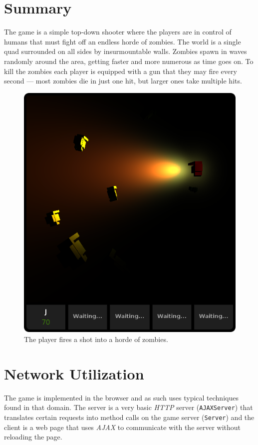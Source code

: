 \documentclass{article}
\begin{document}
\section{Summary}
The game is a simple top-down shooter where the players are in control of humans
that must fight off an endless horde of zombies.  The world is a single quad
surrounded on all sides by insurmountable walls.  Zombies spawn in waves
randomly around the area, getting faster and more numerous as time goes on.  To
kill the zombies each player is equipped with a gun that they may fire every
second --- most zombies die in just one hit, but larger ones take multiple hits.

\begin{figure}[h!]
\centering
\includegraphics[width=0.75\linewidth]{zombies.png}
\caption{The player fires a shot into a horde of zombies.}
\end{figure}

\section{Network Utilization}
The game is implemented in the browser and as such uses typical techniques found
in that domain.  The server is a very basic \textit{HTTP} server (\texttt{AJAXServer})
that translates certain requests into
method calls on the game server (\texttt{Server}) and the client is a web page
that uses \textit{AJAX} to communicate with the server without reloading the page.
\end{document}
